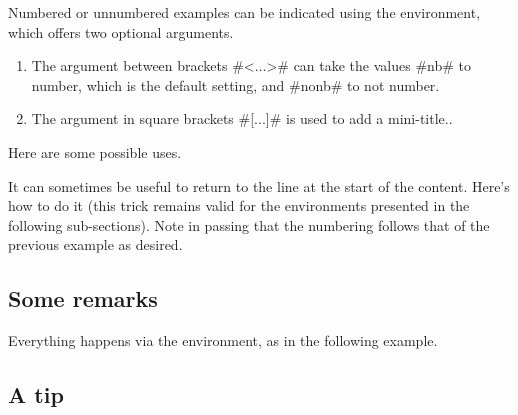 Numbered or unnumbered examples can be indicated using the  environment, which offers two optional arguments.

\begin{enumerate}
    \item The  argument between brackets \tdocinlatex#<...># can take the values \tdocinlatex#nb# to number, which is the default setting, and \tdocinlatex#nonb# to not number.

    \item The  argument in square brackets \tdocinlatex#[...]# is used to add a mini-title..
\end{enumerate}


Here are some possible uses.










\begin{tdoctip}
    It can sometimes be useful to return to the line at the start of the content. Here's how to do it (this trick remains valid for the environments presented in the following sub-sections). Note in passing that the numbering follows that of the previous example as desired.


\end{tdoctip}


\subsection{Some remarks}

Everything happens via the  environment, as in the following example.




\subsection{A tip}

